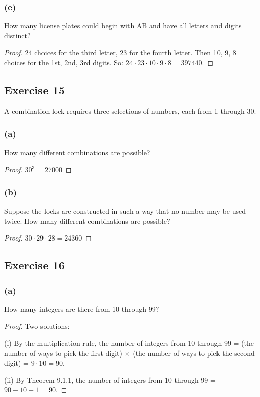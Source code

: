 \documentclass[14pt]{extarticle}
\begin{document}
\subsubsection{(e)}
How many license plates could begin with AB and have all letters and digits distinct?

\begin{proof}
24 choices for the third letter, 23 for the fourth letter. Then 10, 9, 8 choices for the 1st, 2nd, 3rd digits. So:
\(24 \cdot 23 \cdot 10 \cdot 9 \cdot 8 = 397440\).
\end{proof}

\subsection{Exercise 15}
A combination lock requires three selections of numbers, each from 1 through 30.

\subsubsection{(a)}
How many different combinations are possible?

\begin{proof}
\(30^3 = 27000\)
\end{proof}

\subsubsection{(b)}
Suppose the locks are constructed in such a way that no number may be used twice. How many different combinations 
are possible?

\begin{proof}
\(30 \cdot 29 \cdot 28 = 24360\)
\end{proof}

\subsection{Exercise 16}
\subsubsection{(a)}
How many integers are there from 10 through 99?

\begin{proof}
Two solutions:

(i) By the multiplication rule, the number of integers from 10 through 99 = (the number of ways to pick the first 
digit) \(\times\) (the number of ways to pick the second digit) = \(9 \cdot 10 = 90\).

(ii) By Theorem 9.1.1, the number of integers from 10 through 99 = \(90 - 10 + 1 = 90\).
\end{proof}
\end{document}
